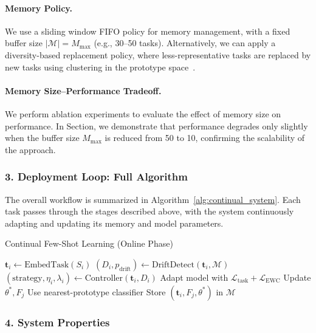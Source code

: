 \documentclass[conference]{IEEEtran}
\begin{document}
\paragraph{Memory Policy.}  
We use a sliding window FIFO policy for memory management, with a fixed buffer size $|\mathcal{M}| = M_{\text{max}}$ (e.g., 30–50 tasks). Alternatively, we can apply a diversity-based replacement policy, where less-representative tasks are replaced by new tasks using clustering in the prototype space~\cite{rebuffi2017icarl}.

\paragraph{Memory Size–Performance Tradeoff.}
We perform ablation experiments to evaluate the effect of memory size on performance. In Section, we demonstrate that performance degrades only slightly when the buffer size $M_{\text{max}}$ is reduced from 50 to 10, confirming the scalability of the approach.

\subsubsection*{3. Deployment Loop: Full Algorithm}

The overall workflow is summarized in Algorithm~\ref{alg:continual_system}. Each task passes through the stages described above, with the system continuously adapting and updating its memory and model parameters.

\begin{algorithm}[H]
\caption{Continual Few-Shot Learning (Online Phase)}
\label{alg:continual_system}
\begin{algorithmic}[1]
    \State $\mathbf{t}_i \gets \text{EmbedTask}(S_i)$
    \State $(D_i, p_{\text{drift}}) \gets \text{DriftDetect}(\mathbf{t}_i, \mathcal{M})$
    \State $(\text{strategy}, \eta_i, \lambda_i) \gets \text{Controller}(\mathbf{t}_i, D_i)$
        \State Adapt model with $\mathcal{L}_{\text{task}} + \mathcal{L}_{\text{EWC}}$
        \State Update $\theta^*, F_j$
    \Else
        \State Use nearest-prototype classifier
    \EndIf
    \State Store $(\mathbf{t}_i, F_j, \theta^*)$ in $\mathcal{M}$
\EndFor
\end{algorithmic}
\end{algorithm}

\subsubsection*{4. System Properties}
\end{document}
